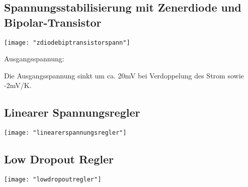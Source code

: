 \subsection{Spannungsstabilisierung mit Zenerdiode und Bipolar-Transistor}
\begin{minipage}[t]{0.3\textwidth}
	\vspace{0pt}								%
	\texttt{[image: "zdiodebiptransistorspann"]}
\end{minipage}\hspace{0.05\textwidth}
\begin{minipage}[t]{0.65\textwidth}
	\vspace{0pt}								%
	Ausgangsspannung: 
	
	Die Ausgangsspannung sinkt um ca. 20mV bei Verdoppelung des Strom sowie -2mV/K.
	
\end{minipage}
\vspace{2mm}


\subsection{Linearer Spannungsregler}
\begin{minipage}[t]{0.3\textwidth}
	\vspace{0pt}								%
	\texttt{[image: "linearerspannungsregler"]}
\end{minipage}\hspace{0.05\textwidth}
\begin{minipage}[t]{0.65\textwidth}
	\vspace{0pt}								%
\end{minipage}
\vspace{2mm}


\subsection{Low Dropout Regler}
\begin{minipage}[t]{0.3\textwidth}
	\vspace{0pt}								%
	\texttt{[image: "lowdropoutregler"]}
\end{minipage}\hspace{0.05\textwidth}
\begin{minipage}[t]{0.65\textwidth}
	\vspace{0pt}								%
	
\end{minipage}
\vspace{2mm}


